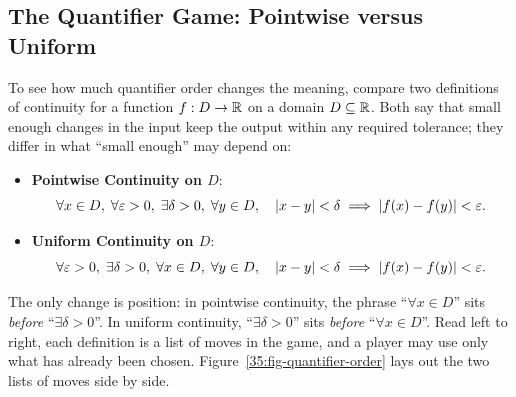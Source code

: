 \subsection{The Quantifier Game: Pointwise versus Uniform}

To see how much quantifier order changes the meaning, compare two definitions of continuity for a function $f: D \to \mathbb{R}$ on a domain $D \subseteq \mathbb{R}$. Both say that small enough changes in the input keep the output within any required tolerance; they differ in what ``small enough'' may depend on:

\begin{itemize}
  \item \textbf{Pointwise Continuity on $D$}:
  \[
  \forall x \in D, \; \forall \varepsilon > 0, \; \exists \delta > 0, \; \forall y \in D, \quad |x - y| < \delta \implies |f(x) - f(y)| < \varepsilon.
  \]
  \item \textbf{Uniform Continuity on $D$}:
  \[
  \forall \varepsilon > 0, \; \exists \delta > 0, \; \forall x \in D, \; \forall y \in D, \quad |x - y| < \delta \implies |f(x) - f(y)| < \varepsilon.
  \]
\end{itemize}

The only change is position: in pointwise continuity, the phrase ``$\forall x \in D$'' sits \emph{before} ``$\exists \delta > 0$''. In uniform continuity, ``$\exists \delta > 0$'' sits \emph{before} ``$\forall x \in D$''. Read left to right, each definition is a list of moves in the game, and a player may use only what has already been chosen. Figure~\ref{35:fig-quantifier-order} lays out the two lists of moves side by side.

